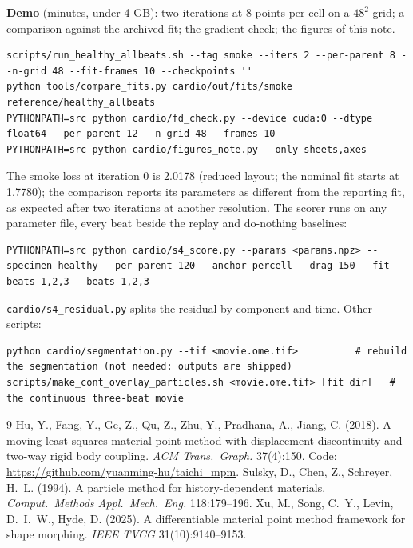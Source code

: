 \documentclass[10pt]{article}
\newcommand{\code}[1]{\texttt{#1}}
\begin{document}
\textbf{Demo} (minutes, under 4 GB): two iterations at 8 points per cell on a $48^2$ grid; a comparison
against the archived fit; the gradient check; the figures of this note.
\begin{lstlisting}[style=sh]
scripts/run_healthy_allbeats.sh --tag smoke --iters 2 --per-parent 8 --n-grid 48 --fit-frames 10 --checkpoints ''
python tools/compare_fits.py cardio/out/fits/smoke reference/healthy_allbeats
PYTHONPATH=src python cardio/fd_check.py --device cuda:0 --dtype float64 --per-parent 12 --n-grid 48 --frames 10
PYTHONPATH=src python cardio/figures_note.py --only sheets,axes
\end{lstlisting}
The smoke loss at iteration 0 is 2.0178 (reduced layout; the nominal fit starts at 1.7780); the comparison
reports its parameters as different from the reporting fit, as expected after two iterations at another
resolution. The scorer runs on any parameter file, every beat beside the replay and do-nothing baselines:
\begin{lstlisting}[style=sh]
PYTHONPATH=src python cardio/s4_score.py --params <params.npz> --specimen healthy --per-parent 120 --anchor-percell --drag 150 --fit-beats 1,2,3 --beats 1,2,3
\end{lstlisting}
\code{cardio/s4\_residual.py} splits the residual by component and time. Other scripts:
\begin{lstlisting}[style=sh]
python cardio/segmentation.py --tif <movie.ome.tif>          # rebuild the segmentation (not needed: outputs are shipped)
scripts/make_cont_overlay_particles.sh <movie.ome.tif> [fit dir]   # the continuous three-beat movie
\end{lstlisting}

\begin{thebibliography}{9}\small
{} Hu, Y., Fang, Y., Ge, Z., Qu, Z., Zhu, Y., Pradhana, A., Jiang, C. (2018). A moving least squares
material point method with displacement discontinuity and two-way rigid body coupling. \emph{ACM Trans.\ Graph.}
37(4):150. Code: \url{https://github.com/yuanming-hu/taichi_mpm}.
 Sulsky, D., Chen, Z., Schreyer, H.~L. (1994). A particle method for history-dependent materials.
\emph{Comput.\ Methods Appl.\ Mech.\ Eng.} 118:179--196.
 Xu, M., Song, C.~Y., Levin, D.~I.~W., Hyde, D. (2025). A differentiable material point method
framework for shape morphing. \emph{IEEE TVCG} 31(10):9140--9153.
\end{thebibliography}
\end{document}
